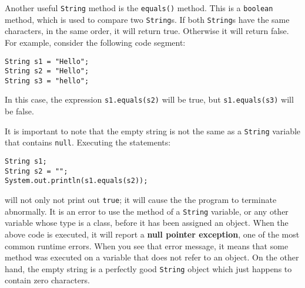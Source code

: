 Another useful {\tt String} method is the {\tt equals()}
method. This is a {\tt boolean} method, which is used to compare two
{\tt String}s. If both {\tt String}s have the same characters, in the
same order, it will return true. Otherwise it will return false. For
example, consider the following code segment:

\begin{jjjlisting}
\begin{lstlisting}
String s1 = "Hello";
String s2 = "Hello";
String s3 = "hello";
\end{lstlisting}
\end{jjjlisting}

\noindent In this case, the expression {\tt s1.equals(s2)} will be
true, but {\tt s1.equals(s3)} will be false. 

It is important to note that the empty string is not the same as a
{\tt String} variable that contains {\tt null}. 
Executing the statements:

\begin{jjjlisting}
\begin{lstlisting}
String s1;
String s2 = "";
System.out.println(s1.equals(s2));
\end{lstlisting}
\end{jjjlisting}

\noindent will not only not print out {\tt true}; it will cause the
the program to terminate abnormally.  It is an error to use the
method of a {\tt String} variable, or any other variable whose type is a class,
before it has been assigned an object.  
When the above code is executed, it will report a 
{\bf null pointer exception}, one of the most common runtime errors.
When you see that error message, it means that some  method was executed 
on a variable that does not refer to an object.  On the other hand, the
empty string is a perfectly good {\tt String} object which just happens 
to contain zero characters.

